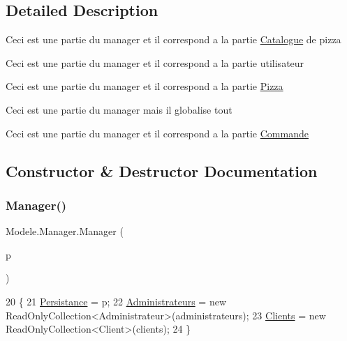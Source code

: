 \subsection{Detailed Description}
Ceci est une partie du manager et il correspond a la partie \hyperlink{classModele_1_1Catalogue}{Catalogue} de pizza 

Ceci est une partie du manager et il correspond a la partie utilisateur 

Ceci est une partie du manager et il correspond a la partie \hyperlink{classModele_1_1Pizza}{Pizza} 

Ceci est une partie du manager mais il globalise tout 

Ceci est une partie du manager et il correspond a la partie \hyperlink{classModele_1_1Commande}{Commande} 

\subsection{Constructor \& Destructor Documentation}
\mbox{\label{classModele_1_1Manager_aa088a20e96bca5adaa3305f2245f99f3}} 
\subsubsection{\texorpdfstring{Manager()}{Manager()}}
{\footnotesize\ttfamily Modele.\+Manager.\+Manager (\begin{DoxyParamCaption}\item[{\hyperlink{interfaceModele_1_1IPersistanceManager}{I\+Persistance\+Manager}}]{p }\end{DoxyParamCaption})\hspace{0.3cm}{\ttfamily [inline]}}


\begin{DoxyCode}
20         \{
21             \hyperlink{classModele_1_1Manager_a29b4f8c42f993178aac1d16da7942324}{Persistance} = p;
22             \hyperlink{classModele_1_1Manager_ac8440a9781b104ad429965fcd460bf2f}{Administrateurs} = \textcolor{keyword}{new} ReadOnlyCollection<Administrateur>(administrateurs);
23             \hyperlink{classModele_1_1Manager_aa91d850a379289e56012fc9b3912a7fe}{Clients} = \textcolor{keyword}{new} ReadOnlyCollection<Client>(clients);
24         \}
\end{DoxyCode}


